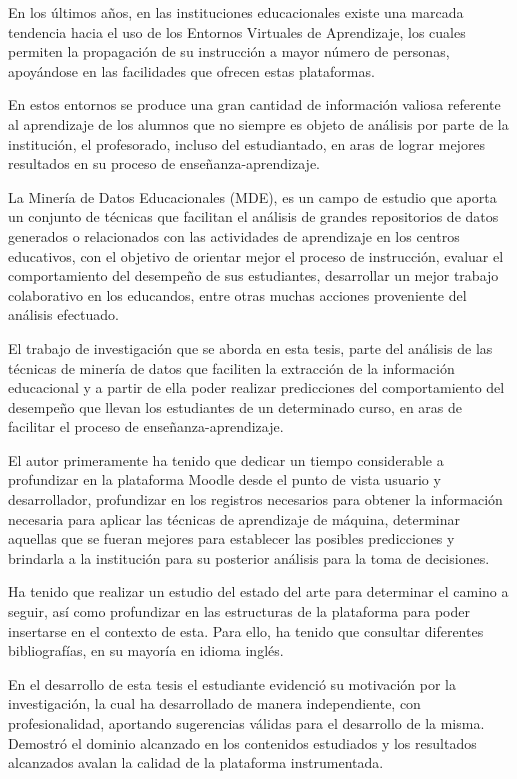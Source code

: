 \begin{opinion}
    En los últimos años, en las instituciones educacionales existe una marcada tendencia hacia el uso de los Entornos Virtuales de Aprendizaje, los cuales permiten la propagación de su instrucción a mayor número de personas, apoyándose en las facilidades que ofrecen estas plataformas.  

En estos entornos se produce una gran cantidad de información valiosa referente al aprendizaje de los alumnos que no siempre es objeto de análisis por parte de la institución, el profesorado, incluso del estudiantado, en aras de lograr mejores resultados en su proceso de enseñanza-aprendizaje.  

La Minería de Datos Educacionales (MDE), es un campo de estudio que aporta un conjunto de técnicas que facilitan el análisis de grandes repositorios de datos generados o relacionados con las actividades de aprendizaje en los centros educativos, con el objetivo de orientar mejor el proceso de instrucción, evaluar el comportamiento del desempeño de sus estudiantes, desarrollar un mejor trabajo colaborativo en los educandos, entre otras muchas acciones proveniente del análisis efectuado.  

El trabajo de investigación que se aborda en esta tesis, parte del análisis de las técnicas de minería de datos que faciliten la extracción de la información educacional y a partir de ella poder realizar predicciones del comportamiento del desempeño que llevan los estudiantes de un determinado curso, en aras de facilitar el proceso de enseñanza-aprendizaje.  

El autor primeramente ha tenido que dedicar un tiempo considerable a profundizar en la plataforma Moodle desde el punto de vista usuario y desarrollador, profundizar en los registros necesarios para obtener la información necesaria para aplicar las técnicas de aprendizaje de máquina, determinar aquellas que se fueran mejores para establecer las posibles predicciones y brindarla a la institución para su posterior análisis para la toma de decisiones.  

Ha tenido que realizar un estudio del estado del arte para determinar el camino a seguir, así como profundizar en las estructuras de la plataforma para poder insertarse en el contexto de esta. Para ello, ha tenido que consultar diferentes bibliografías, en su mayoría en idioma inglés.  

En el desarrollo de esta tesis el estudiante evidenció su motivación por la investigación, la cual ha desarrollado de manera independiente, con profesionalidad, aportando sugerencias válidas para el desarrollo de la misma. Demostró el dominio alcanzado en los contenidos estudiados y los resultados alcanzados avalan la calidad de la plataforma instrumentada.  


\end{opinion}
